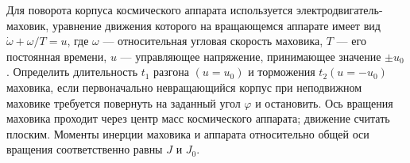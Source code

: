 Для поворота корпуса космического аппарата используется
электродвигатель-маховик, уравнение движения которого на вращающемся аппарате
имеет вид $\dot{\omega} + \omega / T = u$, где $\omega$ --- относительная
угловая скорость маховика, $T$ --- его постоянная времени, $u$ --- управляющее
напряжение, принимающее значение $\pm u_0$.
Определить длительность $t_1$ разгона $(u = u_0)$
и торможения $t_2$$(u = -u_0)$ маховика, если первоначально невращающийся
корпус при неподвижном маховике требуется повернуть
на заданный угол $\varphi$ и остановить.
Ось вращения маховика проходит через центр масс космического аппарата;
движение считать плоским.
Моменты инерции маховика и аппарата относительно общей оси вращения
соответственно равны $J$ и $J_0$.
